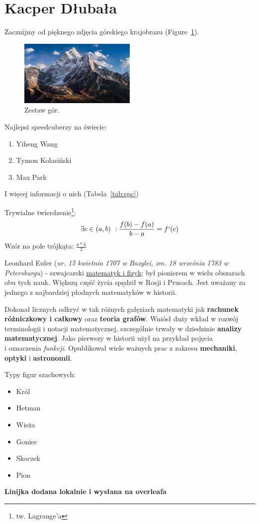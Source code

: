 \section{Kacper Dłubała}
\label{sec:kdlub}

Zacznijmy od pięknego zdjęcia górskiego krajobrazu (Figure~\ref{fig:mnt}).

\begin{figure}[htbp]
    \centering
    \includegraphics[width=0.5\textwidth]{pictures/gory.jpg}
    \caption{Zestaw gór.}
    \label{fig:mnt}
\end{figure}

Najlepsi speedcuberzy na świecie:
\begin{enumerate}
    \item Yiheng Wang
    \item Tymon Kolasiński
    \item Max Park
\end{enumerate}

I więcej informacji o nich (Tabela~\ref{tab:spc}) 



Trywialne twierdzenie\footnote{tw. Lagrange'a}: \[\exists c\in(a, b)\ : \frac{f(b)-f(a)}{b-a}=f`(c)\]
Wzór na pole trójkąta: $\frac{a*h}{2}$

\vspace{1cm}

Leonhard Euler (\textit{ur. 15 kwietnia 1707 w Bazylei, zm. 18 września 1783 w Petersburgu}) - szwajcarski \underline{matematyk i fizyk}; był pionierem w wielu obszarach obu tych nauk. Większą część życia spędził w Rosji i Prusach. Jest uważany za jednego z najbardziej płodnych matematyków w historii.

Dokonał licznych odkryć w tak różnych gałęziach matematyki jak \textbf{rachunek różniczkowy i całkowy} oraz \textbf{teoria grafów}. Wniósł duży wkład w rozwój terminologii i notacji matematycznej, szczególnie trwały w dziedzinie \textbf{analizy matematycznej}. Jako pierwszy w historii użył na przykład pojęcia \\i oznaczenia \emph{funkcji}. Opublikował wiele ważnych prac z zakresu \textbf{mechaniki}, \textbf{optyki} i \textbf{astronomii}.

\vspace{1cm}

Typy figur szachowych:
\begin{itemize}
    \item Król
    \item Hetman
    \item Wieża
    \item Goniec
    \item Skoczek
    \item Pion
\end{itemize}

\textbf{Linijka dodana lokalnie i wysłana na overleafa}



